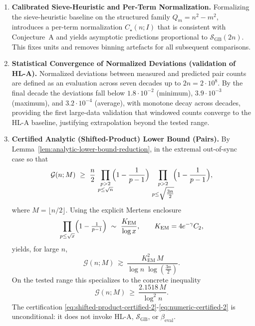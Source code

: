 \documentclass[11pt]{article}
\theoremstyle{inline}
\theoremstyle{break}
\theoremstyle{break}
\theoremstyle{break}
\theoremstyle{break}
\theoremstyle{break}
\theoremstyle{break}
\theoremstyle{break}
\theoremstyle{inline}
\newcommand{\xLambdaMinLimit}{1.8\cdot 10^{-2}} %
\newcommand{\xLambdaMaxLimit}{3.9\cdot 10^{-3}} %
\newcommand{\xLambdaAvgLimit}{3.2\cdot 10^{-4}} %
\newcommand{\SGB}{\mathcal{S}_{\scriptscriptstyle\mathrm{GB}}}
\newcommand{\betacal}{\beta_{\mathrm{eval}}}
\newcommand{\Kem}{K_{\mathrm{EM}}}              %
\begin{document}
\begin{enumerate}
  \item \textbf{Calibrated Sieve-Heuristic and Per-Term Normalization.}
  Formalizing the sieve-heuristic baseline on the structured family \(Q_m=n^2-m^2\), introduces a per-term normalization \( C_\star(n;I) \) that is consistent with Conjecture~A and yields asymptotic predictions proportional to \( \SGB(2n) \). This fixes units and removes binning artefacts for all subsequent comparisons.

  \item \textbf{Statistical Convergence of Normalized Deviations (validation of HL-A).}
  Normalized deviations between measured and predicted pair counts are defined as an evaluation across seven decades up to \(2n=2\cdot 10^8\). By the final decade the deviations fall below
  \( \xLambdaMinLimit \) (minimum), \( \xLambdaMaxLimit \) (maximum), and \( \xLambdaAvgLimit \) (average), with monotone decay across decades, providing the first large-data validation that windowed counts converge to the HL-A baseline, justifying extrapolation beyond the tested range.

  \item \textbf{Certified Analytic (Shifted-Product) Lower Bound (Pairs).}
  By Lemma~\ref{lem:analytic-lower-bound-reduction}, in the extremal out-of-sync case so that
  \begin{equation}\label{eq:shifted-product-certified-2}
    \mathcal{G}(n;M)\ \ge\ \frac{n}{2}\,
    \prod_{\substack{p>2\\ p\le \sqrt{n}}}\!\Bigl(1-\frac{1}{p-1}\Bigr)\,
    \prod_{\substack{p>2\\ p\le \sqrt{\tfrac{3n}{2}}}}\!\Bigl(1-\frac{1}{p-1}\Bigr),
  \end{equation}
  where \( M=\lfloor n/2\rfloor \). Using the explicit Mertens enclosure
  \cite{RosserSchoenfeld1962, Dusart2010, HardyLittlewood1923, MontgomeryVaughan2007}
  \begin{equation}\label{eq:mertens-enclosure-2}
    \prod_{p\le \sqrt{x}}\Bigl(1-\tfrac{1}{p-1}\Bigr)\ \sim\ \frac{\Kem}{\log x},
    \qquad \Kem=4e^{-\gamma}C_2,
  \end{equation}
  yields, for large \(n\),
  \begin{equation}\label{eq:asymp-certified-2}
    \mathcal{G}(n;M)\ \gtrsim\ \frac{\Kem^2\,M}{\log n\;\log(\tfrac{3n}{2})}.
  \end{equation}
  On the tested range this specializes to the concrete inequality
  \begin{equation}\label{eq:numeric-certified-2}
    \mathcal{G}(n;M)\ \ge\ \frac{2.1518\,M}{\log^2 n}.
  \end{equation}
  The certification \eqref{eq:shifted-product-certified-2}-\eqref{eq:numeric-certified-2} is unconditional: it does not invoke HL-A, \( \SGB \), or \( \betacal \).


\end{enumerate}
\end{document}
